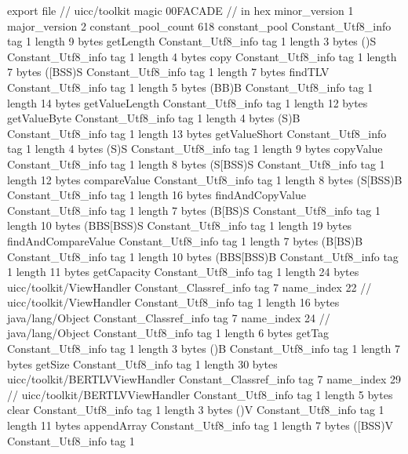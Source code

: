 export file {		// uicc/toolkit
	magic	00FACADE		 // in hex
	minor_version	1
	major_version	2
	constant_pool_count	618
	constant_pool {
		Constant_Utf8_info {
			tag	1
			length	9
			bytes	getLength
		}
		Constant_Utf8_info {
			tag	1
			length	3
			bytes	()S
		}
		Constant_Utf8_info {
			tag	1
			length	4
			bytes	copy
		}
		Constant_Utf8_info {
			tag	1
			length	7
			bytes	([BSS)S
		}
		Constant_Utf8_info {
			tag	1
			length	7
			bytes	findTLV
		}
		Constant_Utf8_info {
			tag	1
			length	5
			bytes	(BB)B
		}
		Constant_Utf8_info {
			tag	1
			length	14
			bytes	getValueLength
		}
		Constant_Utf8_info {
			tag	1
			length	12
			bytes	getValueByte
		}
		Constant_Utf8_info {
			tag	1
			length	4
			bytes	(S)B
		}
		Constant_Utf8_info {
			tag	1
			length	13
			bytes	getValueShort
		}
		Constant_Utf8_info {
			tag	1
			length	4
			bytes	(S)S
		}
		Constant_Utf8_info {
			tag	1
			length	9
			bytes	copyValue
		}
		Constant_Utf8_info {
			tag	1
			length	8
			bytes	(S[BSS)S
		}
		Constant_Utf8_info {
			tag	1
			length	12
			bytes	compareValue
		}
		Constant_Utf8_info {
			tag	1
			length	8
			bytes	(S[BSS)B
		}
		Constant_Utf8_info {
			tag	1
			length	16
			bytes	findAndCopyValue
		}
		Constant_Utf8_info {
			tag	1
			length	7
			bytes	(B[BS)S
		}
		Constant_Utf8_info {
			tag	1
			length	10
			bytes	(BBS[BSS)S
		}
		Constant_Utf8_info {
			tag	1
			length	19
			bytes	findAndCompareValue
		}
		Constant_Utf8_info {
			tag	1
			length	7
			bytes	(B[BS)B
		}
		Constant_Utf8_info {
			tag	1
			length	10
			bytes	(BBS[BSS)B
		}
		Constant_Utf8_info {
			tag	1
			length	11
			bytes	getCapacity
		}
		Constant_Utf8_info {
			tag	1
			length	24
			bytes	uicc/toolkit/ViewHandler
		}
		Constant_Classref_info {
			tag	7
			name_index	22		// uicc/toolkit/ViewHandler
		}
		Constant_Utf8_info {
			tag	1
			length	16
			bytes	java/lang/Object
		}
		Constant_Classref_info {
			tag	7
			name_index	24		// java/lang/Object
		}
		Constant_Utf8_info {
			tag	1
			length	6
			bytes	getTag
		}
		Constant_Utf8_info {
			tag	1
			length	3
			bytes	()B
		}
		Constant_Utf8_info {
			tag	1
			length	7
			bytes	getSize
		}
		Constant_Utf8_info {
			tag	1
			length	30
			bytes	uicc/toolkit/BERTLVViewHandler
		}
		Constant_Classref_info {
			tag	7
			name_index	29		// uicc/toolkit/BERTLVViewHandler
		}
		Constant_Utf8_info {
			tag	1
			length	5
			bytes	clear
		}
		Constant_Utf8_info {
			tag	1
			length	3
			bytes	()V
		}
		Constant_Utf8_info {
			tag	1
			length	11
			bytes	appendArray
		}
		Constant_Utf8_info {
			tag	1
			length	7
			bytes	([BSS)V
		}
		Constant_Utf8_info {
			tag	1
}}}
